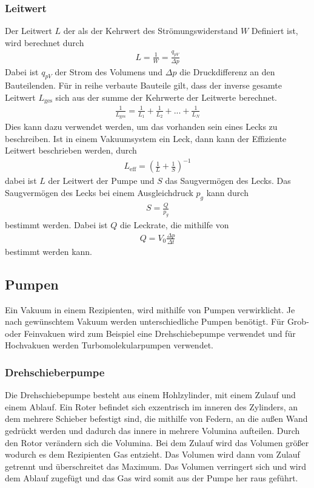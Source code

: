\subsubsection{Leitwert}
Der Leitwert $L$ der als der Kehrwert des Strömungswiderstand $W$ Definiert ist, wird berechnet durch
\begin{align}
L=\frac{1}{W} = \frac{q_{pV}}{\Delta p}
\end{align}
Dabei ist $q_{pV}$ der Strom des Volumens und $\Delta p$ die Druckdifferenz an den Bauteilenden. Für in reihe verbaute Bauteile  gilt, dass der inverse gesamte Leitwert $L_\text{ges}$ sich aus der summe der Kehrwerte der Leitwerte berechnet.
 \begin{align}
 \frac{1}{L_\text{ges}}=\frac{1}{L_1}+\frac{1}{L_2}+...+\frac{1}{L_N}
 \end{align}
Dies kann dazu verwendet werden, um das vorhanden sein eines Lecks zu beschreiben. Ist in einem Vakuumsystem ein Leck, dann kann der Effiziente Leitwert beschrieben werden, durch
\begin{align}
L_\text{eff}=\left(\frac{1}{L} + \frac{1}{S}  \right)^{-1}
\end{align}
dabei ist $L$ der Leitwert der Pumpe und $S$ das Saugvermögen des Lecks. Das Saugvermögen des Lecks bei einem Ausgleichdruck $p_g$ kann durch 
\begin{align}
S=\frac{Q}{p_g}
\end{align}
bestimmt werden. Dabei ist $Q$ die Leckrate, die mithilfe von 
\begin{align}
Q = V_0 \frac{\Delta p}{\Delta t}
\end{align}
bestimmt werden kann.
 
\subsection{Pumpen}
Ein Vakuum in einem Rezipienten, wird mithilfe von Pumpen verwirklicht. Je nach gewünschtem Vakuum werden unterschiedliche Pumpen benötigt. Für Grob- oder Feinvakuen wird zum Beispiel eine Drehschiebepumpe verwendet und für Hochvakuen werden Turbomolekularpumpen verwendet.
\subsubsection{Drehschieberpumpe}
Die Drehschiebepumpe besteht aus einem Hohlzylinder, mit einem Zulauf und einem Ablauf. Ein Roter befindet sich exzentrisch im inneren des Zylinders, an dem mehrere Schieber befestigt sind, die mithilfe von Federn, an die außen Wand gedrückt werden und dadurch das innere in mehrere Volumina aufteilen. Durch den Rotor verändern sich die Volumina. Bei dem Zulauf wird das Volumen größer wodurch es dem Rezipienten Gas entzieht. Das Volumen wird dann vom Zulauf getrennt und überschreitet das Maximum. Das Volumen verringert sich  und wird dem Ablauf zugefügt und das Gas wird somit aus der Pumpe her raus geführt.

